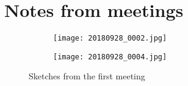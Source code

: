 \chapter{Notes from meetings}
\label{ch:notes}

\begin{figure}
    \centering
    \begin{subfigure}{0.4\textwidth}
        \centering
        \texttt{[image: 20180928\_0002.jpg]}
    \end{subfigure}
    \hspace{0.05\textwidth}
    \begin{subfigure}{0.4\textwidth}
        \centering
        \texttt{[image: 20180928\_0004.jpg]}
    \end{subfigure}
    \caption{Sketches from the first meeting}
    \label{fig:sketch-meeting}
\end{figure}
